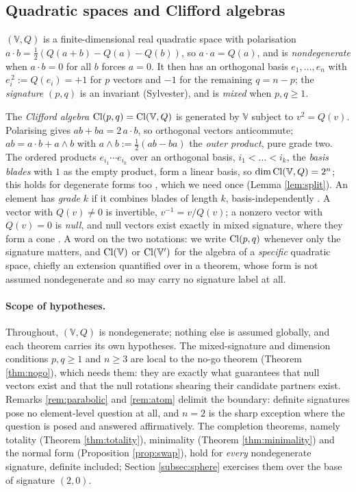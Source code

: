 \subsection{Quadratic spaces and Clifford algebras}\label{subsec:quadratic}

$(\mathbb{V}, Q)$ is a finite-dimensional real quadratic space with polarisation $a \cdot b = \tfrac12(Q(a+b) - Q(a) - Q(b))$, so $a \cdot a = Q(a)$, and is \emph{nondegenerate} when $a \cdot b = 0$ for all $b$ forces $a = 0$. It then has an orthogonal basis $e_1, \dots, e_n$ with $e_i^{\,2} \mathrel{:=} Q(e_i) = +1$ for $p$ vectors and $-1$ for the remaining $q = n-p$; the \emph{signature} $(p,q)$ is an invariant (Sylvester), and is \emph{mixed} when $p, q \geq 1$.

The \emph{Clifford algebra} $\mathrm{Cl}(p,q) = \mathrm{Cl}(\mathbb{V}, Q)$ is generated by $\mathbb{V}$ subject to $v^2 = Q(v)$. Polarising gives $ab + ba = 2\,a \cdot b$, so orthogonal vectors anticommute; $ab = a \cdot b + a \wedge b$ with $a \wedge b \mathrel{:=} \tfrac12(ab-ba)$ the \emph{outer product}, pure grade two. The ordered products $e_{i_1} \cdots e_{i_k}$ over an orthogonal basis, $i_1 < \dots < i_k$, the \emph{basis blades} with $1$ as the empty product, form a linear basis, so $\dim \mathrm{Cl}(\mathbb{V},Q) = 2^n$; this holds for degenerate forms too \cite{Chevalley1997}, which we need once (Lemma \ref{lem:split}). An element has \emph{grade} $k$ if it combines blades of length $k$, basis-independently \cite{Porteous1995}. A vector with $Q(v) \neq 0$ is invertible, $v^{-1} = v/Q(v)$; a nonzero vector with $Q(v) = 0$ is \emph{null}, and null vectors exist exactly in mixed signature, where they form a cone \cite[Sections 2 to 4]{ButlerT0}. A word on the two notations: we write $\mathrm{Cl}(p,q)$ whenever only the signature matters, and $\mathrm{Cl}(\mathbb{V})$ or $\mathrm{Cl}(\mathbb{V}')$ for the algebra of a \emph{specific} quadratic space, chiefly an extension quantified over in a theorem, whose form is not assumed nondegenerate and so may carry no signature label at all.

\paragraph{Scope of hypotheses.} Throughout, $(\mathbb{V}, Q)$ is nondegenerate; nothing else is assumed globally, and each theorem carries its own hypotheses. The mixed-signature and dimension conditions $p, q \geq 1$ and $n \geq 3$ are local to the no-go theorem (Theorem \ref{thm:nogo}), which needs them: they are exactly what guarantees that null vectors exist and that the null rotations shearing their candidate partners exist. Remarks \ref{rem:parabolic} and \ref{rem:atom} delimit the boundary: definite signatures pose no element-level question at all, and $n = 2$ is the sharp exception where the question is posed and answered affirmatively. The completion theorems, namely totality (Theorem \ref{thm:totality}), minimality (Theorem \ref{thm:minimality}) and the normal form (Proposition \ref{prop:swap}), hold for \emph{every} nondegenerate signature, definite included; Section \ref{subsec:sphere} exercises them over the base of signature $(2,0)$.

